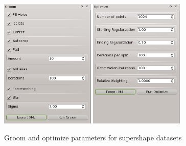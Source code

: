 \documentclass[letterpaper,12pt]{article}   %
\begin{document}
\vspace{0.1in}
\begin{figure}[!htp]
\centering
\includegraphics[width=0.4\textwidth]{figs/supershapes_groom.png}
\includegraphics[width=0.4\textwidth]{figs/supershapes_optimize.png}
\caption{Groom and optimize parameters for supershape datasets }
\label{fig:supershape_params}
\end{figure}
\end{document}
